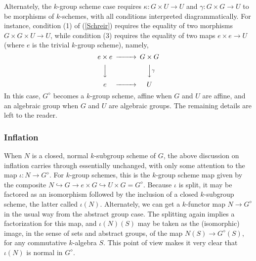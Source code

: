 \documentclass[11pt,leqno,amscd,amssymb,verbatim, url]{amsart}
\theoremstyle{definition}
\numberwithin{equation}{thm}
\begin{document}
Alternately, the $k$-group scheme case requires $\kappa:G\times U\to U$ and $\gamma:G\times G\to U$ to be
morphisms of $k$-schemes, with all conditions interpreted diagrammatically. For instance, condition (1) of
(\ref{Schreir}) requires the equality of two morphisms $G\times G\times U\to U$, while condition (3) requires
the equality of two maps $e\times e\to U$  (where $e$ is the trivial $k$-group scheme), namely,
 $$\begin{CD} e\times e @>>> G\times G \\
@VVV @ VV\gamma V \\
e @>>> U\end{CD}
$$
In this case, $G^\diamond$ becomes a $k$-group scheme, affine when $G$ and $U$ are affine, and an algebraic group
when $G$ and $U$ are algebraic groups. The remaining details are left to the reader.


\subsubsection{Inflation} When $N$ is a closed, normal $k$-subgroup scheme of $G$, the above discussion on inflation carries through  essentially unchanged, with only some attention to the map $\iota:N\to G^\diamond$. For $k$-group schemes, this is the
$k$-group scheme map given by the composite $N\hookrightarrow G\to e\times G\hookrightarrow U\times G=G^\diamond$. Because $\iota$ is split, it may be factored as an isomorphism followed
by the inclusion of a closed $k$-subgroup scheme, the latter called
$\iota(N)$. Alternately,
we can
get a $k$-functor map $N\to G^\diamond$ in the usual way from the abstract group case.  The splitting again implies a factorization for this map, and $\iota(N)(S)$ may
be taken as the
(isomorphic) image, in the sense of sets and abstract groups, of
the map $N(S)\to G^\diamond(S)$, for any commutative $k$-algebra $S$. This point of view makes it very clear that
$\iota(N)$ is normal in $G^\diamond$.
\end{document}
